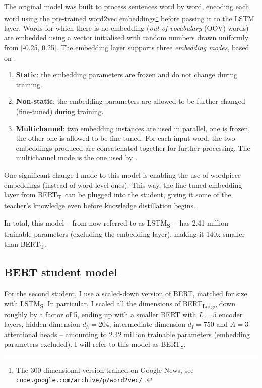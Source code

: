 \documentclass[bsc,frontabs,twoside,singlespacing,parskip,deptreport]{infthesis}
\def\BERTT{BERT\textsubscript{T}}
\def\BERTS{BERT\textsubscript{S}}
\def\LSTMS{LSTM\textsubscript{S}}
\newcommand\rurl[1]{%
  \href{https://#1}{\nolinkurl{#1}}%
}
\begin{document}
{{{      The original model was built to process sentences word by word, encoding each word using the pre-trained word2vec embeddings\footnote{The 300-dimensional version trained on Google News, see \rurl{code.google.com/archive/p/word2vec/}.} before passing it to the LSTM layer. Words for which there is no embedding (\textit{out-of-vocabulary} (OOV) words) are embedded using a vector initialised with random numbers drawn uniformly from [-0.25, 0.25]. The embedding layer supports three \textit{embedding modes}, based on \citet{Kim_2014}:
      \begin{enumerate}
        \item \textbf{Static}: the embedding parameters are frozen and do not change during training.
        \item \textbf{Non-static}: the embedding parameters are allowed to be further changed (fine-tuned) during training.
        \item \textbf{Multichannel}: two embedding instances are used in parallel, one is frozen, the other one is allowed to be fine-tuned. For each input word, the two embeddings produced are concatenated together for further processing. The multichannel mode is the one used by \citeauthor{Tang_2019b}.
      \end{enumerate}

      One significant change I made to this model is enabling the use of wordpiece embeddings (instead of word-level ones). This way, the fine-tuned embedding layer from \BERTT~can be plugged into the student, giving it some of the teacher's knowledge even before knowledge distillation begins.

      In total, this model -- from now referred to as \LSTMS~-- has 2.41 million trainable parameters (excluding the embedding layer), making it 140x smaller than \BERTT.
    }

    \subsection{BERT student model}{
      For the second student, I use a scaled-down version of BERT, matched for size with \LSTMS. In particular, I scaled all the dimensions of BERT\textsubscript{Large} down roughly by a factor of 5, ending up with a smaller BERT with $L=5$ encoder layers, hidden dimension $d_h=204$, intermediate dimension $d_I=750$ and $A=3$ attentional heads -- amounting to 2.42 million trainable parameters (embedding parameters excluded). I will refer to this model as \BERTS.
    }

}}
\end{document}
